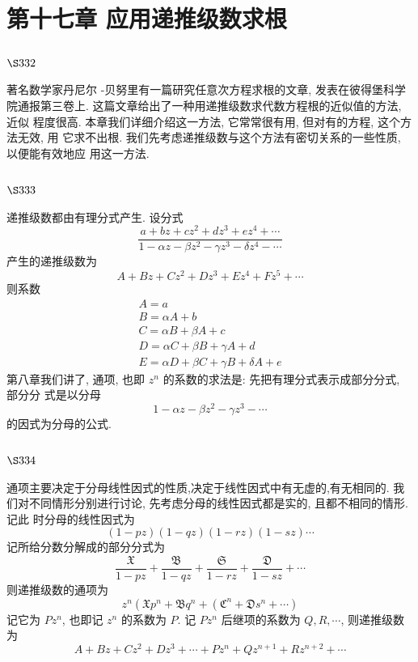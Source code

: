 \chapter{第十七章 应用递推级数求根}

\section{$\S 332$}

著名数学家丹尼尔 -贝努里有一篇研究任意次方程求根的文章, 发表在彼得堡科学 院通报第三卷上. 这篇文章给出了一种用递推级数求代数方程根的近似值的方法, 近似 程度很高. 本章我们详细介绍这一方法, 它常常很有用, 但对有的方程, 这个方法无效, 用 它求不出根. 我们先考虑递推级数与这个方法有密切关系的一些性质, 以便能有效地应 用这一方法.

\section{$\S 333$}

递推级数都由有理分式产生. 设分式
\[
\frac{a+b z+c z^{2}+d z^{3}+e z^{4}+\cdots}{1-\alpha z-\beta z^{2}-\gamma z^{3}-\delta z^{4}-\cdots}
\]
产生的递推级数为
\[
A+B z+C z^{2}+D z^{3}+E z^{4}+F z^{5}+\cdots
\]
则系数
\[
\begin{gathered}
A=a \\
B=\alpha A+b \\
C=\alpha B+\beta A+c \\
D=\alpha C+\beta B+\gamma A+d \\
E=\alpha D+\beta C+\gamma B+\delta A+e
\end{gathered}
\]
第八章我们讲了, 通项, 也即 $z^{n}$ 的系数的求法是: 先把有理分式表示成部分分式, 部分分 式是以分母
\[
1-\alpha z-\beta z^{2}-\gamma z^{3}-\cdots
\]
的因式为分母的公式. 

\section{$\S 334$}

通项主要决定于分母线性因式的性质,决定于线性因式中有无虚的,有无相同的. 我 们对不同情形分别进行讨论, 先考虑分母的线性因式都是实的, 且都不相同的情形. 记此 时分母的线性因式为
\[
(1-p z)(1-q z)(1-r z)(1-s z) \cdots
\]
记所给分数分解成的部分分式为
\[
\frac{\mathfrak{X}}{1-p z}+\frac{\mathfrak{B}}{1-q z}+\frac{\mathfrak{S}}{1-r z}+\frac{\mathfrak{D}}{1-s z}+\cdots
\]
则递推级数的通项为
\[
z^{n}\left(\mathfrak{X} p^{n}+\mathfrak{B} q^{n}+\left(\mathfrak{C}^{n}+\mathfrak{D} s^{n}+\cdots\right)\right.
\]
记它为 $P z^{n}$, 也即记 $z^{n}$ 的系数为 $P$. 记 $P z^{n}$ 后继项的系数为 $Q, R, \cdots$, 则递推级数为
\[
A+B z+C z^{2}+D z^{3}+\cdots+P z^{n}+Q z^{n+1}+R z^{n+2}+\cdots
\]
